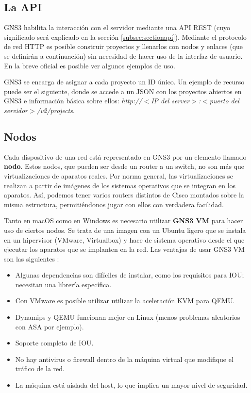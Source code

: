 \subsection{La API}
GNS3 habilita la interacción con el servidor mediante una API REST (cuyo significado será explicado en la sección \ref{subsec:sectionapi}). Mediante el protocolo de red HTTP es posible construir proyectos y llenarlos con nodos y enlaces (que se definirán a continuación) sin necesidad de hacer uso de la interfaz de usuario. En la breve  oficial es posible ver algunos ejemplos de uso.

GNS3 se encarga de asignar a cada proyecto un ID único. Un ejemplo de recurso puede ser el siguiente, donde se accede a un JSON con los proyectos abiertos en GNS3 e información básica sobre ellos: \textit{http://$<$IP del server$>$:$<$puerto del servidor$>$/v2/projects}.

\subsection{Nodos}
Cada dispositivo de una red está representado en GNS3 por un elemento llamado \textbf{nodo}. Estos nodos, que pueden ser desde un router a un switch, no son más que virtualizaciones de aparatos reales. Por norma general, las virtualizaciones se realizan a partir de imágenes de los sistemas operativos que se integran en los aparatos. Así, podemos tener varios routers distintos de Cisco montados sobre la misma estructura, permitiéndonos jugar con ellos con verdadera facilidad.

Tanto en macOS como en Windows es necesario utilizar \textbf{GNS3 VM} para hacer uso de ciertos nodos. Se trata de una imagen con un Ubuntu ligero que se instala en un hipervisor (VMware, Virtualbox) y hace de sistema operativo desde el que ejecutar los aparatos que se implanten en la red. Las ventajas de usar GNS3 VM son las siguientes \cite{gns3vm}:
\begin{itemize}
\item Algunas dependencias son difíciles de instalar, como los requisitos para IOU; necesitan una librería específica.
\item Con VMware es posible utilizar utilizar la aceleración KVM para QEMU.
\item Dynamips y QEMU funcionan mejor en Linux (menos problemas aleatorios con ASA por ejemplo).
\item Soporte completo de IOU.
\item No hay antivirus o firewall dentro de la máquina virtual que modifique el tráfico de la red.
\item La máquina está aislada del host, lo que implica un mayor nivel de seguridad.
\end{itemize}

